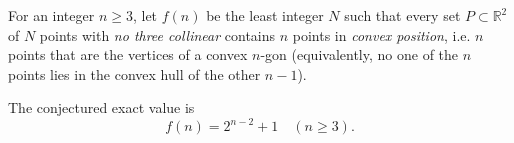 For an integer $n\ge3$, let $f(n)$ be the least integer $N$ such that every set $P\subset\mathbb R^2$ of $N$ points with \emph{no three collinear} contains $n$ points in \emph{convex position}, i.e. $n$ points that are the vertices of a convex $n$-gon (equivalently, no one of the $n$ points lies in the convex hull of the other $n-1$).

The conjectured exact value is
\[
 f(n)=2^{n-2}+1\quad(n\ge3).
\]
